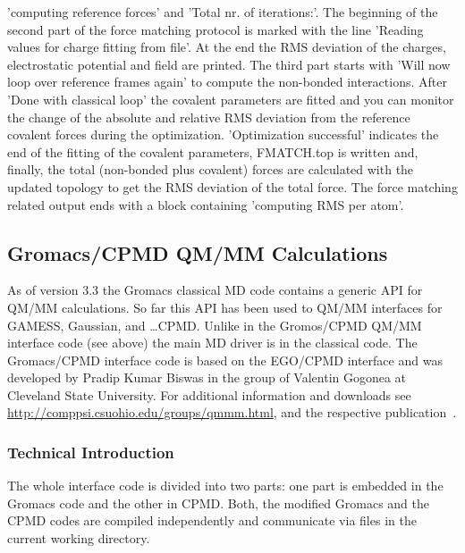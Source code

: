 \documentclass[twoside,10pt,titlepage,a4paper]{article}
\newcommand{\htref}[2]{\href{#1}{#2}}
\newcommand{\htref}[2]{\htmladdnormallink{#2}{#1}}
\begin{document}
'computing reference forces' and 'Total nr. of iterations:'. The beginning of the second part of the
force matching protocol is marked with the line 'Reading values for charge fitting from file'. At
the end the RMS deviation of the charges, electrostatic potential and field are printed. The third
part starts with 'Will now loop over reference frames again' to compute the non-bonded interactions.
After 'Done with classical loop' the covalent parameters are fitted and you can monitor the change
of the absolute and relative RMS deviation from the reference covalent forces during the
optimization. 'Optimization successful' indicates the end of the fitting of the covalent parameters,
FMATCH.top is written and, finally, the total (non-bonded plus covalent) forces are calculated with
the updated topology to get the RMS deviation of the total force. The force matching related output
ends with a block containing 'computing RMS per atom'.

%
%
\subsection{Gromacs/CPMD QM/MM Calculations}\label{sec:gmxqmmm}
As of version 3.3 the Gromacs\cite{gmx3} classical MD code contains
a generic API for QM/MM calculations. So far this API has been used to
QM/MM interfaces for GAMESS, Gaussian, and \dots CPMD. Unlike in the
Gromos/CPMD QM/MM interface code (see above) the main MD driver is in
the classical code. The Gromacs/CPMD interface code is based on the
EGO/CPMD interface and was developed by Pradip Kumar Biswas in the
group of Valentin Gogonea at Cleveland State University.
For additional information and downloads see
\htref{http://comppsi.csuohio.edu/groups/qmmm.html}{http://comppsi.csuohio.edu/groups/qmmm.html},
and the respective publication~\cite{gmxqmmm}.

\subsubsection{Technical Introduction}
The whole interface code is divided into two parts: one part is
embedded in the Gromacs code and the other in CPMD. Both, the modified
Gromacs and the CPMD codes are compiled independently and communicate
via files in the current working directory.
\end{document}
